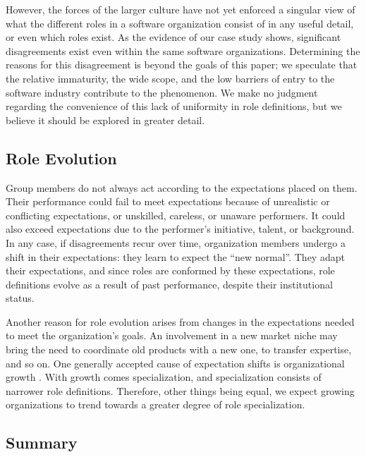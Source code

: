 \documentclass[10pt, conference, compsocconf]{IEEEtran}
\begin{document}
However, the forces of the larger culture have not yet enforced a singular view of what the different roles in a software organization consist of in any useful detail, or even which roles exist. As the evidence of our case study shows, significant disagreements exist even within the same software organizations. Determining the reasons for this disagreement is beyond the goals of this paper; we speculate that the relative immaturity, the wide scope, and the low barriers of entry to the software industry contribute to the phenomenon. We make no judgment regarding the convenience of this lack of uniformity in role definitions, but we believe it should be explored in greater detail.


\subsection{Role Evolution}

Group members do not always act according to the expectations placed on them. Their performance could fail to meet expectations because of unrealistic or conflicting expectations, or unskilled, careless, or unaware performers. It could also exceed expectations due to the performer's initiative, talent, or background. In any case, if disagreements recur over time, organization members undergo a shift in their expectations: they learn to expect the ``new normal''. They adapt their expectations, and since roles are conformed by these expectations, role definitions evolve as a result of past performance, despite their institutional status.

Another reason for role evolution arises from changes in the expectations needed to meet the organization's goals. An involvement in a new market niche may bring the need to coordinate old products with a new one, to transfer expertise, and so on. One generally accepted cause of expectation shifts is organizational growth \cite{Blau1971,Haveman1993}. With growth comes specialization, and specialization consists of narrower role definitions. Therefore, other things being equal, we expect growing organizations to trend towards a greater degree of role specialization.


\subsection{Summary}
\end{document}

